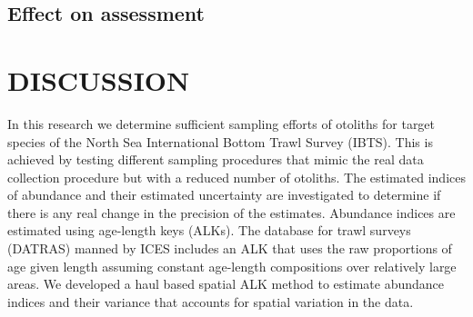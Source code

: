 \documentclass[a4paper 12pt]{article}
\numberwithin{equation}{section}
\newcommand{\ed}[1]{\textcolor{red}{#1}}
\begin{document}
\begin{figure}[h!]
\begin{tabular}{@{}ccc@{}}
\end{tabular}
\end{figure} 



\subsection{Effect on assessment}
\clearpage
\section{DISCUSSION}
\label{sec:discussion}

In this research we determine sufficient sampling efforts of otoliths for target species of the North Sea International Bottom Trawl Survey (IBTS). This is achieved by testing different sampling procedures that mimic the real data collection procedure but with a reduced number of otoliths. The estimated indices of abundance and their estimated uncertainty are investigated to determine if there is any real change in the precision of the estimates. Abundance indices are estimated using age-length keys (ALKs). The database for trawl surveys (DATRAS) manned by ICES includes an ALK that uses the raw proportions of age given length assuming constant age-length compositions over relatively large areas. We developed a haul based spatial ALK method  to estimate abundance indices and their variance that accounts for spatial variation in the data. 


%
\end{document}
